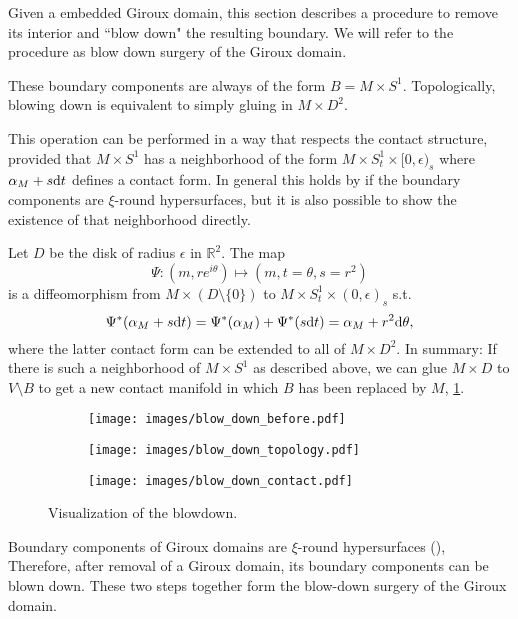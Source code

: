 Given a embedded Giroux domain, this section describes a procedure
to remove its interior and ``blow down" the resulting boundary.
We will refer to the procedure as blow down surgery of the Giroux domain.

These boundary components are always of the form $B = M \times S^1$.
Topologically, blowing down is equivalent to simply gluing in $M\times D^2$.

This operation can be performed in a way that respects the contact structure,
provided that $M \times S^1$ has a neighborhood
of the form $M \times S^1_t \times [0, \epsilon)_s$ where $\alpha_M + s \mathrm{d} t$
defines a contact form.
In general this holds by \cite[Lemma 5.1]{MNW13} if the boundary components 
are $\xi$-round hypersurfaces, but it is also possible to show the existence 
of that neighborhood directly.

Let $D$ be the disk of radius $\epsilon$ in $\mathbb R^2$. The map 
\[
    \Psi \colon (m, re^{i\theta}) \mapsto (m, t = \theta, s = r^2)
\]
is a diffeomorphism from $M \times (D \setminus \{0\})$ to 
$M \times S^1_t \times (0, \epsilon)_s$ s.t.
\[
    \Psi^*(\alpha_M + s \mathrm{d} t) = \Psi^*(\alpha_M) + \Psi^*(s\mathrm{d} t) 
    = \alpha_M + r^2 \mathrm{d} \theta,
\]
where the latter contact form can be extended to all of $M \times D^2$.
In summary: If there is such a neighborhood of $M \times S^1$ as described above, 
we can glue $M \times D$ to $V \setminus B$ to get a new contact manifold 
in which $B$ has been replaced by $M$, \cref{fig:blowdown}.

\begin{figure}
    \begin{subfigure}[t]{.293\linewidth}
        \texttt{[image: images/blow\_down\_before.pdf]}
    \end{subfigure}\hspace*{.1\linewidth}
    \begin{subfigure}[t]{.6\linewidth}
        \texttt{[image: images/blow\_down\_topology.pdf]}
    \end{subfigure}
    \begin{subfigure}{.9\linewidth}
        \texttt{[image: images/blow\_down\_contact.pdf]}
    \end{subfigure}
    \caption{Visualization of the blowdown.}
    \label{fig:blowdown}
\end{figure}

Boundary components of Giroux domains are 
$\xi$-round hypersurfaces (\cite[Section 5.3]{MNW13}),
Therefore, after removal of a Giroux domain,
its boundary components can be blown down.
These two steps together form the blow-down surgery of the Giroux domain.